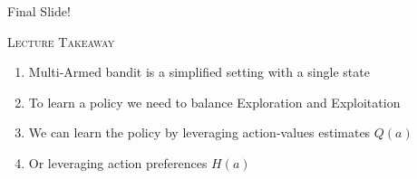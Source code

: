 \documentclass{beamer}
\newenvironment{takeaway}[1]{%
\definecolor{shadecolor}{gray}{0.9}%
	\begin{shaded}{\color{skymagenta}\noindent\textsc{#1}}\\%
	}{%
	\end{shaded}%
}
\begin{document}
\begin{frame}{Final Slide!}
	\begin{takeaway}{Lecture Takeaway}
		\begin{enumerate}
		    \item Multi-Armed bandit is a simplified setting with a single state
		    \item To learn a policy we need to balance Exploration and Exploitation
			\item We can learn the policy by leveraging action-values estimates $Q(a)$
			\item Or leveraging action preferences $H(a)$
		\end{enumerate}
	\end{takeaway}
\end{frame}
\end{document}

